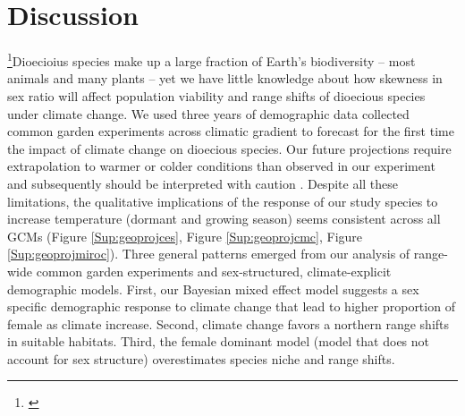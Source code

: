 \documentclass[12pt]{article}
\newcommand{\tom}[2]{{\color{red}{#1}}\footnote{\textit{\color{red}{#2}}}}
\newcommand{\jacob}[2]{{\color{blue}{#1}}\footnote{\textit{\color{blue}{#2}}}}
\begin{document}
\section*{Discussion}
\jacob{}{This is my new proposition regarding the discussion}Dioecioius species make up a large fraction of Earth's biodiversity -- most animals and many plants -- yet we have little knowledge about how skewness in sex ratio will affect population viability and range shifts of dioecious species under climate change.
We used three years of demographic data collected common garden experiments across climatic gradient to forecast for the first time the impact of climate change on dioecious species.
Our future projections require extrapolation to warmer or colder conditions than observed in our experiment and subsequently should be interpreted with caution \citep{chen2024influence}.
Despite all these limitations, the qualitative implications of the response of our study species to increase temperature (dormant and growing season) seems consistent across all GCMs (Figure \ref{Sup:geoprojces}, Figure \ref{Sup:geoprojcmc}, Figure \ref{Sup:geoprojmiroc}).  
Three general patterns emerged from our analysis of range-wide common garden experiments and sex-structured, climate-explicit demographic models.
First, our Bayesian mixed effect model suggests a sex specific demographic response to climate change that lead to higher proportion of female as climate increase.
Second, climate change favors a northern range shifts in suitable  habitats. 
Third, the female dominant model (model that does not account for sex structure) overestimates species niche and range shifts.
\end{document}
